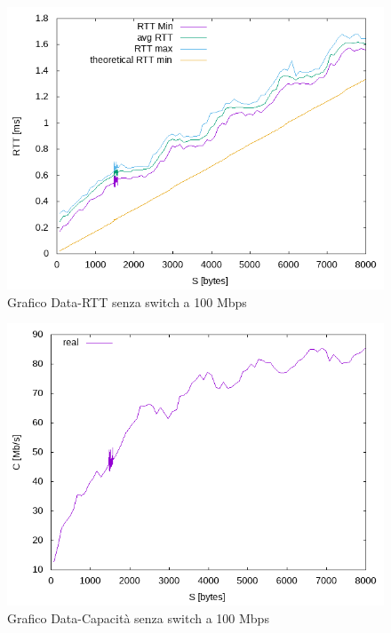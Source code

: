 \documentclass{exam}
\begin{document}
\begin{figure}[H]
	\centering
	\includegraphics[scale = 0.75]{No_Switch/RTT-100Mbps.png}
	\caption{Grafico Data-RTT senza switch a 100 Mbps}
	\label{fig:2.2RTT}
\end{figure}


\begin{figure}[H]
	\centering
	\includegraphics[scale = 0.75]{No_Switch/speed-100Mbps.png}
	\caption{Grafico Data-Capacità senza switch a 100 Mbps}
	\label{fig:2.2Speed}
\end{figure}
\end{document}
